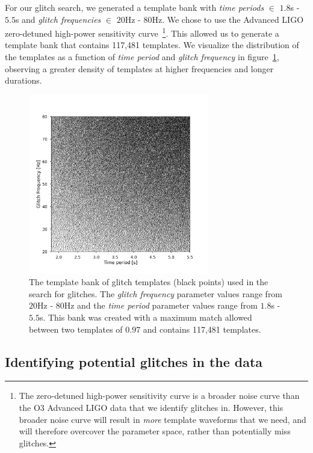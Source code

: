 For our \scl{} glitch search, we generated a template bank with \emph{time periods} $\in$ $1.8$s - $5.5$s and \emph{glitch frequencies} $\in$ $20$Hz - $80$Hz. We chose to use the Advanced LIGO zero-detuned high-power sensitivity curve~\cite{aLIGO_design_curve:2018}\footnote{The zero-detuned high-power sensitivity curve is a broader noise curve than the O3 Advanced LIGO data that we identify \scl{} glitches in. However, this broader noise curve will result in \emph{more} template waveforms that we need, and will therefore overcover the parameter space, rather than potentially miss \scl{} glitches.}. This allowed us to generate a template bank that contains 117,481 templates. We visualize the distribution of the templates as a function of \emph{time period} and \emph{glitch frequency} in figure~\ref{4:fig:sq_bank}, observing a greater density of templates at higher frequencies and longer durations.

\begin{figure}
  \centering
  \includegraphics[width=0.7\textwidth]{images/4_archenemy/Section3/3.2/template_bank_square.pdf}
  \caption{The template bank of \scl{} glitch templates (black points) used in the search for \scl{} glitches. The \emph{glitch frequency} parameter values range from $20$Hz - $80$Hz and the \emph{time period} parameter values range from $1.8$s - $5.5$s. This bank was created with a maximum match allowed between two templates of $0.97$ and contains 117,481 templates.}
  \label{4:fig:sq_bank}
\end{figure}

\subsection{Identifying potential \scl{} glitches in the data}

